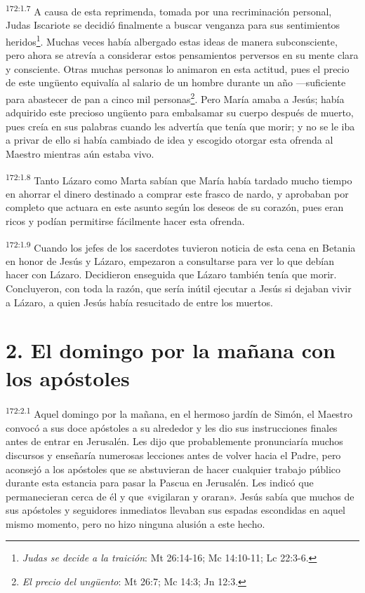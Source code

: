 \par 
\textsuperscript{172:1.7} A causa de esta reprimenda, tomada por una recriminación personal, Judas Iscariote se decidió finalmente a buscar venganza para sus sentimientos heridos\footnote{\textit{Judas se decide a la traición}: Mt 26:14-16; Mc 14:10-11; Lc 22:3-6.}. Muchas veces había albergado estas ideas de manera subconsciente, pero ahora se atrevía a considerar estos pensamientos perversos en su mente clara y consciente. Otras muchas personas lo animaron en esta actitud, pues el precio de este ung\"uento equivalía al salario de un hombre durante un año ---suficiente para abastecer de pan a cinco mil personas\footnote{\textit{El precio del ung\"uento}: Mt 26:7; Mc 14:3; Jn 12:3.}. Pero María amaba a Jesús; había adquirido este precioso ung\"uento para embalsamar su cuerpo después de muerto, pues creía en sus palabras cuando les advertía que tenía que morir; y no se le iba a privar de ello si había cambiado de idea y escogido otorgar esta ofrenda al Maestro mientras aún estaba vivo.

\par 
\textsuperscript{172:1.8} Tanto Lázaro como Marta sabían que María había tardado mucho tiempo en ahorrar el dinero destinado a comprar este frasco de nardo, y aprobaban por completo que actuara en este asunto según los deseos de su corazón, pues eran ricos y podían permitirse fácilmente hacer esta ofrenda.

\par 
\textsuperscript{172:1.9} Cuando los jefes de los sacerdotes tuvieron noticia de esta cena en Betania en honor de Jesús y Lázaro, empezaron a consultarse para ver lo que debían hacer con Lázaro. Decidieron enseguida que Lázaro también tenía que morir. Concluyeron, con toda la razón, que sería inútil ejecutar a Jesús si dejaban vivir a Lázaro, a quien Jesús había resucitado de entre los muertos.

\section*{2. El domingo por la mañana con los apóstoles}
\par 
\textsuperscript{172:2.1} Aquel domingo por la mañana, en el hermoso jardín de Simón, el Maestro convocó a sus doce apóstoles a su alrededor y les dio sus instrucciones finales antes de entrar en Jerusalén. Les dijo que probablemente pronunciaría muchos discursos y enseñaría numerosas lecciones antes de volver hacia el Padre, pero aconsejó a los apóstoles que se abstuvieran de hacer cualquier trabajo público durante esta estancia para pasar la Pascua en Jerusalén. Les indicó que permanecieran cerca de él y que «vigilaran y oraran». Jesús sabía que muchos de sus apóstoles y seguidores inmediatos llevaban sus espadas escondidas en aquel mismo momento, pero no hizo ninguna alusión a este hecho.

